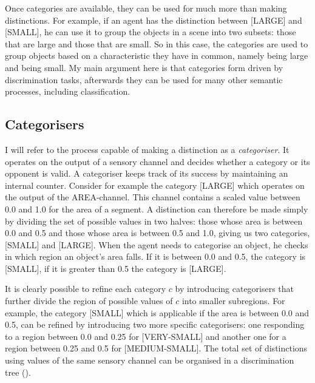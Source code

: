 Once categories are available, they can be 
used for much more than making distinctions. For example, 
if an agent has the distinction between [LARGE] and [SMALL],
he can use it to group the objects in a scene into two
subsets: those that are large and those that are small. 
So in this case, the categories are used to group 
objects based on a characteristic they have in common, 
namely being large and being small. My main argument here is that 
categories form driven by discrimination tasks,
afterwards they can be used for many other 
semantic processes, including classification. 

\subsection{Categorisers}

I will refer to the process capable of making a distinction as
a {\itshape categoriser}. %
It operates on the output of 
a sensory channel and decides whether a category or its opponent
is valid. A categoriser keeps track of its success 
by maintaining an internal counter. 
Consider for example the category [LARGE] which 
operates on the output of the AREA-channel. This channel 
contains a scaled value 
between 0.0 and 1.0 for the area of a segment. A distinction 
can therefore be 
made simply by dividing the set of possible values in two
halves: those whose area is between
0.0 and 0.5 and those whose area is between 0.5 and
1.0, giving us two categories, [SMALL] and [LARGE]. When 
the agent needs to categorise an object, he checks in which
region an object's area falls. If it is between 0.0 and 0.5, the
category is [SMALL], if it is greater than 0.5 the category
is [LARGE]. 

It is clearly possible to refine each 
category $c$ by introducing categorisers that 
further divide the region of possible values of $c$ into 
smaller subregions. For example, the category [SMALL] which 
is applicable if the area is between 0.0 and 0.5, can be refined 
by introducing two more specific categorisers: one responding
to a region between 0.0 and 
0.25 for [VERY-SMALL] and another one for a region
between 0.25 and 0.5 for [MEDIUM-SMALL]. The total set of
distinctions using values of the same sensory channel
can be organised in a discrimination tree (). 

